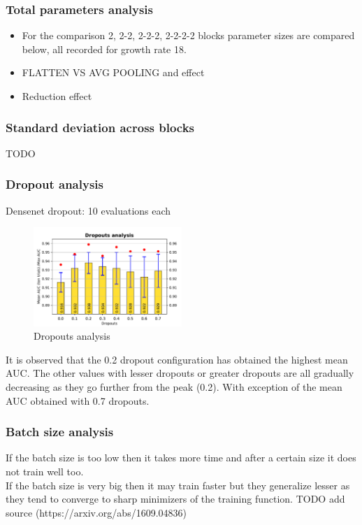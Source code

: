 \subsubsection{Total parameters analysis}
\begin{itemize}
 \item For the comparison 2, 2-2, 2-2-2, 2-2-2-2 blocks parameter sizes are compared below, all recorded for growth rate 18.
 \item FLATTEN VS AVG POOLING and effect
 \item Reduction effect
\end{itemize}

\subsubsection{Standard deviation across blocks}
TODO

\subsubsection{Dropout analysis}
Densenet dropout: 10 evaluations each \\
\begin{figure}[ht]
\centering
\includegraphics[width=0.5\textwidth]{images/densenet/simple/densenet_simple_dropout}
\caption{\label{fig:densenet_simple_dropout}Dropouts analysis}
\end{figure}

It is observed that the 0.2 dropout configuration has obtained the highest mean AUC. The other values with lesser dropouts or greater dropouts are all gradually decreasing as they go further from the peak (0.2). 
With exception of the mean AUC obtained with 0.7 dropouts.
\flushbottom
\newpage

\subsubsection{Batch size analysis}
If the batch size is too low then it takes more time and after a certain size it does not train well too.\\
If the batch size is very big then it may train faster but they generalize lesser as they tend to converge to sharp minimizers of the training function.
TODO add source (https://arxiv.org/abs/1609.04836) 


